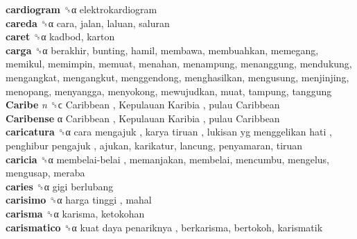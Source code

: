 \textbf{cardiogram} ␝α  elektrokardiogram  \\
\textbf{careda} ␝α  cara, jalan, laluan, saluran  \\
\textbf{caret} ␝α  kadbod, karton  \\
\textbf{carga} ␝α  berakhir, bunting, hamil, membawa, membuahkan, memegang, memikul, memimpin, memuat, menahan, menampung, menanggung, mendukung, mengangkat, mengangkut, menggendong, menghasilkan, mengusung, menjinjing, menopang, menyangga, menyokong, mewujudkan, muat, tampung, tanggung  \\
\textbf{Caribe} \emph{n}  ␝ϲ   Caribbean ,  Kepulauan Karibia ,  pulau Caribbean   \\
\textbf{Caribense} α   Caribbean ,  Kepulauan Karibia ,  pulau Caribbean   \\
\textbf{caricatura} ␝α   cara mengajuk ,  karya tiruan ,  lukisan yg menggelikan hati ,  penghibur pengajuk , ajukan, karikatur, lancung, penyamaran, tiruan  \\
\textbf{caricia} ␝α   membelai-belai , memanjakan, membelai, mencumbu, mengelus, mengusap, meraba  \\
\textbf{caries} ␝α   gigi berlubang   \\
\textbf{carisimo} ␝α   harga tinggi , mahal  \\
\textbf{carisma} ␝α  karisma, ketokohan  \\
\textbf{carismatico} ␝α   kuat daya penariknya , berkarisma, bertokoh, karismatik  \\
